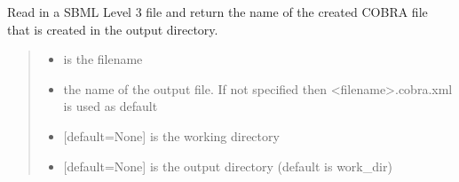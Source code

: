 \documentclass[letterpaper,12pt,english]{sphinxmanual}
\begin{document}
\begin{fulllineitems}
\label{\detokenize{api/io:cbmpy.CBXML.sbml_convertSBML3FBCToCOBRA}}
\pysigstartsignatures
\pysiglinewithargsret
{}
{\sphinxparamcomma {}\sphinxparamcomma {}\sphinxparamcomma {}}
{}
\pysigstopsignatures
\sphinxAtStartPar
Read in a SBML Level 3 file and return the name of the created COBRA file that is created in the output directory.
\begin{quote}\begin{description}
\begin{itemize}
\item {} 
\sphinxAtStartPar
{} \textendash{} is the filename

\item {} 
\sphinxAtStartPar
{} \textendash{} the name of the output file. If not specified then \textless{}filename\textgreater{}.cobra.xml is used as default

\item {} 
\sphinxAtStartPar
{} \textendash{} {[}default=None{]} is the working directory

\item {} 
\sphinxAtStartPar
{} \textendash{} {[}default=None{]} is the output directory (default is work\_dir)

\end{itemize}

\end{description}\end{quote}

\end{fulllineitems}

\end{document}
